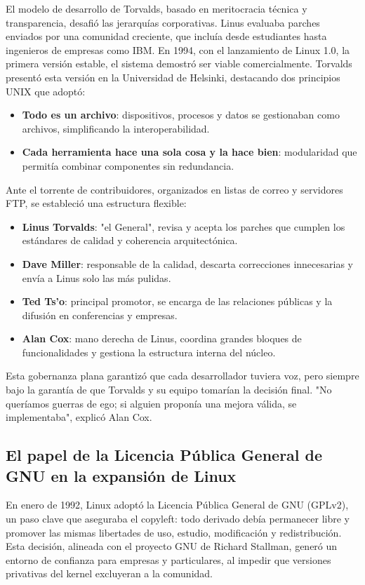 \documentclass[a4paper,12pt]{article}
\begin{document}
El modelo de desarrollo de Torvalds, basado en meritocracia técnica y transparencia, desafió 
las jerarquías corporativas. Linus evaluaba parches enviados por una comunidad creciente, que 
incluía desde estudiantes hasta ingenieros de empresas como IBM. En 1994, con el lanzamiento 
de Linux 1.0, la primera versión estable, el sistema demostró ser viable comercialmente. Torvalds 
presentó esta versión en la Universidad de Helsinki, destacando dos principios UNIX que adoptó:
\begin{itemize}
    \item \textbf{Todo es un archivo}: dispositivos, procesos y datos se gestionaban como archivos, 
    simplificando la interoperabilidad.     
    \item \textbf{Cada herramienta hace una sola cosa y la hace bien}: modularidad 
    que permitía combinar componentes sin redundancia.
\end{itemize}
Ante el torrente de contribuidores, organizados en listas de correo y servidores FTP, se estableció una 
estructura flexible:
\begin{itemize}
    \item \textbf{Linus Torvalds}: "el General", revisa y acepta los parches que cumplen los 
    estándares de calidad y coherencia arquitectónica.
    \item \textbf{Dave Miller}: responsable de la calidad, descarta correcciones innecesarias 
    y envía a Linus solo las más pulidas.
    \item \textbf{Ted Ts’o}: principal promotor, se encarga de las relaciones públicas y la 
    difusión en conferencias y empresas.
    \item \textbf{Alan Cox}: mano derecha de Linus, coordina grandes bloques de 
    funcionalidades y gestiona la estructura interna del núcleo.
\end{itemize} 

Esta gobernanza plana garantizó que cada desarrollador tuviera voz, pero siempre bajo la garantía 
de que Torvalds y su equipo tomarían la decisión final. 
"No queríamos guerras de ego; si alguien proponía una mejora válida, se implementaba", explicó Alan Cox.

\newpage
\subsection{El papel de la Licencia Pública General de GNU en la expansión de Linux}

En enero de 1992, Linux adoptó la Licencia Pública General de GNU (GPLv2), 
un paso clave que aseguraba el copyleft: todo derivado debía permanecer libre 
y promover las mismas libertades de uso, estudio, modificación y redistribución. 
Esta decisión, alineada con el proyecto GNU de Richard Stallman, generó un entorno 
de confianza para empresas y particulares, al impedir que versiones privativas 
del kernel excluyeran a la comunidad.
\end{document}
